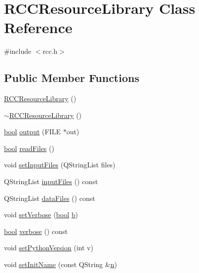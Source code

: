 \hypertarget{classRCCResourceLibrary}{}\section{R\+C\+C\+Resource\+Library Class Reference}
\label{classRCCResourceLibrary}


{\ttfamily \#include $<$rcc.\+h$>$}

\subsection*{Public Member Functions}
\begin{DoxyCompactItemize}
\item 
\hyperlink{classRCCResourceLibrary_af7d3482d5bda81181ac262c281ac7e69}{R\+C\+C\+Resource\+Library} ()
\item 
\hyperlink{classRCCResourceLibrary_a86362214cecbe33c6cbab8a2e096236a}{$\sim$\+R\+C\+C\+Resource\+Library} ()
\item 
\hyperlink{compiler_8h_abb452686968e48b67397da5f97445f5b}{bool} \hyperlink{classRCCResourceLibrary_a1f6273c2d2749f53a2de7bd0b3e08081}{output} (F\+I\+L\+E $\ast$out)
\item 
\hyperlink{compiler_8h_abb452686968e48b67397da5f97445f5b}{bool} \hyperlink{classRCCResourceLibrary_a1c11fb8526cf17cb65639a1715dc437d}{read\+Files} ()
\item 
void \hyperlink{classRCCResourceLibrary_ad98d8c091eb2b871a3d5dc03f78fbdff}{set\+Input\+Files} (Q\+String\+List files)
\item 
Q\+String\+List \hyperlink{classRCCResourceLibrary_aabaedca529fc1d8179aeb19e32bac0db}{input\+Files} () const 
\item 
Q\+String\+List \hyperlink{classRCCResourceLibrary_a3f3cace251f691b172cde65b19d0e739}{data\+Files} () const 
\item 
void \hyperlink{classRCCResourceLibrary_a89c3c8b7d49ef567f9ab1108ec743498}{set\+Verbose} (\hyperlink{compiler_8h_abb452686968e48b67397da5f97445f5b}{bool} \hyperlink{gen__mat5files_8m_a7b38767b3b6a8dae167e5afa4fc340b0}{b})
\item 
\hyperlink{compiler_8h_abb452686968e48b67397da5f97445f5b}{bool} \hyperlink{classRCCResourceLibrary_a55649c8d97b8af9fe0e9572dd8cf60e5}{verbose} () const 
\item 
void \hyperlink{classRCCResourceLibrary_ac88c415e2163987725a5aaa25c529522}{set\+Python\+Version} (int v)
\item 
void \hyperlink{classRCCResourceLibrary_afde7c904907e25409ecbde82f5bb9417}{set\+Init\+Name} (const Q\+String \&\hyperlink{indexexpr_8h_ab427e2e2b4d6cec55fa088ea2a692ace}{n})

\end{DoxyCompactItemize}
